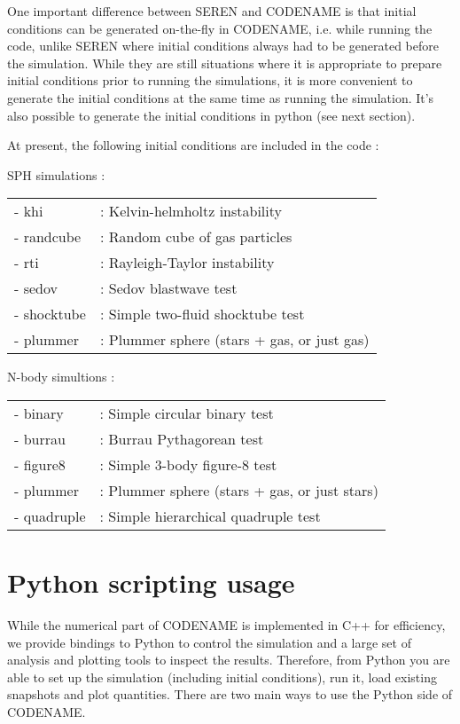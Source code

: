 \documentclass[a4paper]{article}
\begin{document}
One important difference between SEREN and CODENAME is that initial conditions can be generated on-the-fly in CODENAME, i.e. while running the code, unlike SEREN where initial conditions always had to be generated before the simulation.  While they are still situations where it is appropriate to prepare initial conditions prior to running the simulations, it is more convenient to generate the initial conditions at the same time as running the simulation. It's also possible to generate the initial conditions in python (see next section).

At present, the following initial conditions are included in the code : 

\noindent SPH simulations : \\
\begin{tabular}{ll}
- khi       &: Kelvin-helmholtz instability \\
- randcube  &: Random cube of gas particles \\
- rti       &: Rayleigh-Taylor instability \\
- sedov     &: Sedov blastwave test \\
- shocktube &: Simple two-fluid shocktube test \\
- plummer   &: Plummer sphere (stars + gas, or just gas)
\end{tabular}
\newline

\noindent N-body simultions : \\
\begin{tabular}{ll}
- binary    &: Simple circular binary test \\
- burrau    &: Burrau Pythagorean test \\
- figure8   &: Simple 3-body figure-8 test \\
- plummer   &: Plummer sphere (stars + gas, or just stars) \\
- quadruple &: Simple hierarchical quadruple test
\end{tabular}


\section{Python scripting usage}

While the numerical part of CODENAME  is implemented in C++ for efficiency, we provide bindings to Python to control the simulation and a large set of analysis and plotting tools to inspect the results. Therefore, from Python you are able to set up the simulation (including initial conditions), run it, load existing snapshots and plot quantities. There are two main ways to use the Python side of CODENAME.
\end{document}
